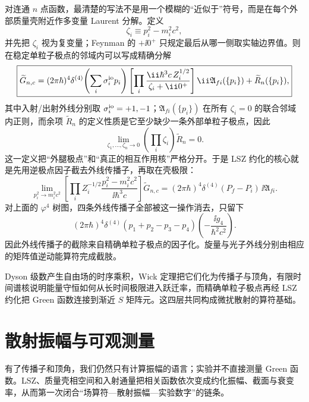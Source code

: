 对连通 $n$ 点函数，最清楚的写法不是用一个模糊的“近似于”符号，而是在每个外部质量壳附近作多变量 Laurent 分解。定义
\[
 \zeta_i\equiv p_i^2-m_i^2c^2,
\]
并先把 $\zeta_i$ 视为复变量；Feynman 的 $+\ii0^+$ 只规定最后从哪一侧取实轴边界值。则在稳定单粒子极点的邻域内可以写成精确分解
\begin{equation}
 \boxed{
 \widetilde G_{n,c}
 =
 (2\pi\hbar)^4\delta^{(4)}\!\left(\sum_i\sigma_i^{\rm io}p_i\right)
 \left[\prod_i
 \frac{\ii\hbar^3c\,Z_i^{1/2}}
 {\zeta_i+\ii0^+}\right]
 \ii\mathfrak A_{fi}(\{p_i\})
 +\widetilde R_n(\{p_i\}),}
 \label{eq:LSZ-factorization-r7}
\end{equation}
其中入射/出射外线分别取 $\sigma_i^{\rm io}=+1,-1$；$\mathfrak A_{fi}(\{p_i\})$ 在所有 $\zeta_i=0$ 的联合邻域内正则，而余项 $\widetilde R_n$ 的定义性质是它至少缺少一条外部单粒子极点，因此
\[
 \lim_{\zeta_1,\ldots,\zeta_n\to0}
 \left(\prod_i\zeta_i\right)\widetilde R_n=0.
\]
这一定义把“外腿极点”和“真正的相互作用核”严格分开。于是 LSZ 约化的核心就是先用逆极点因子截去外线传播子，再取在壳极限：
\begin{equation}
 \boxed{
 \lim_{p_i^2\to m_i^2c^2}
 \left[\prod_i
 Z_i^{-1/2}\frac{p_i^2-m_i^2c^2}{\ii\hbar^3c}\right]
 \widetilde G_{n,c}
 =(2\pi\hbar)^4\delta^{(4)}(P_f-P_i)\,\ii\mathfrak A_{fi}.}
 \label{eq:lsz-momentum-reduction-r7}
\end{equation}
对上面的 $\varphi^4$ 树图，四条外线传播子全部被这一操作消去，只留下
\begin{equation}
 \boxed{
 (2\pi\hbar)^4\delta^{(4)}(p_1+p_2-p_3-p_4)
 \left(-\frac{\ii g_4}{\hbar^2c^2}\right).}
 \label{eq:phi4-lsz-result-r7}
\end{equation}
因此外线传播子的截除来自精确单粒子极点的因子化。旋量与光子外线分别由相应的矩阵值逆动能算符完成截肢。

Dyson 级数产生自由场的时序乘积，Wick 定理把它们化为传播子与顶角，有限时间谱核说明能量守恒如何从长时间极限进入跃迁率，而精确单粒子极点再经 LSZ 约化把 Green 函数连接到渐近 $S$ 矩阵元。这四层共同构成微扰散射的算符基础。




\section{散射振幅与可观测量}

有了传播子和顶角，我们仍然只有计算振幅的语言；实验并不直接测量 Green 函数。LSZ、质量壳相空间和入射通量把相关函数依次变成约化振幅、截面与衰变率，从而第一次闭合“场算符—散射振幅—实验数字”的链条。

